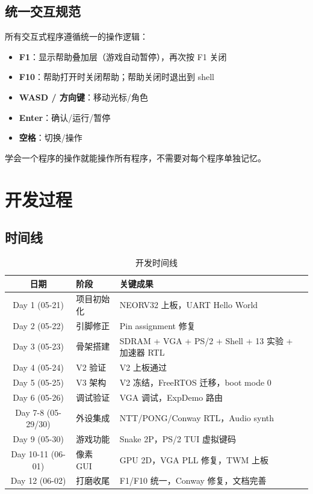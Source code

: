 \documentclass{SYSUReport}
\begin{document}
\subsection{统一交互规范}

所有交互式程序遵循统一的操作逻辑：

\begin{itemize}
    \item \textbf{F1}：显示帮助叠加层（游戏自动暂停），再次按 F1 关闭
    \item \textbf{F10}：帮助打开时关闭帮助；帮助关闭时退出到 shell
    \item \textbf{WASD / 方向键}：移动光标/角色
    \item \textbf{Enter}：确认/运行/暂停
    \item \textbf{空格}：切换/操作
\end{itemize}

学会一个程序的操作就能操作所有程序，不需要对每个程序单独记忆。

\section{开发过程}

\subsection{时间线}

\begin{table}[!htbp]
    \centering
    \small
    \begin{tabular}{c|l|l}
        \hline
        \textbf{日期} & \textbf{阶段} & \textbf{关键成果} \\
        \hline
        Day 1 (05-21) & 项目初始化 & NEORV32 上板，UART Hello World \\
        Day 2 (05-22) & 引脚修正 & Pin assignment 修复 \\
        Day 3 (05-23) & 骨架搭建 & SDRAM + VGA + PS/2 + Shell + 13 实验 + 加速器 RTL \\
        Day 4 (05-24) & V2 验证 & V2 上板通过 \\
        Day 5 (05-25) & V3 架构 & V2 冻结，FreeRTOS 迁移，boot mode 0 \\
        Day 6 (05-26) & 调试验证 & VGA 调试，ExpDemo 路由 \\
        Day 7-8 (05-29/30) & 外设集成 & NTT/PONG/Conway RTL，Audio synth \\
        Day 9 (05-30) & 游戏功能 & Snake 2P，PS/2 TUI 虚拟键码 \\
        Day 10-11 (06-01) & 像素 GUI & GPU 2D，VGA PLL 修复，TWM 上板 \\
        Day 12 (06-02) & 打磨收尾 & F1/F10 统一，Conway 修复，文档完善 \\
        \hline
    \end{tabular}
    \caption{开发时间线}
\end{table}
\end{document}
